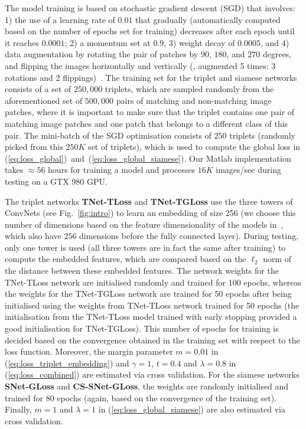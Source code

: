 \documentclass[10pt,twocolumn,letterpaper]{article}
\begin{document}
The model training is based on stochastic gradient descent (SGD) that involves: 1) the use of a learning rate of $0.01$ that gradually (automatically computed based on the number of epochs set for training) decreases after each epoch until it reaches $0.0001$; 2) a momentum set at $0.9$, 3) weight decay of $0.0005$, and 4) data augmentation by rotating the pair of patches by $90$, $180$, and $270$ degrees, and flipping the images horizontally and vertically (\ie, augmented 5 times: 3 rotations and 2 flippings)~\cite{ZagoruykoCVPR15}.
The training set for the triplet and siamese networks consists of a set of $250,000$ triplets, which are  sampled randomly from the aforementioned set of $500,000$ pairs of matching and non-matching image patches, where it is important to make sure that the triplet contains one pair of matching image patches and one patch that belongs to a different class of this pair.
The mini-batch of the SGD optimisation consists of $250$ triplets (randomly picked from this $250K$ set of triplets), which is used to compute the global loss in (\ref{eq:loss_global})~and~(\ref{eq:loss_global_siamese}).
Our Matlab implementation takes $\approx56$ hours for training a model and processes $16K$ images/sec during testing on a GTX 980 GPU.

The triplet networks {\bf TNet-TLoss} and {\bf TNet-TGLoss} use the three towers of ConvNets (see Fig.~\ref{fig:intro}) to learn an embedding of size 256 (we choose this number of dimensions based on the feature dimensionality of the models in~\cite{ZagoruykoCVPR15}, which also have $256$ dimensions before the fully connected layer).  During testing, only one tower is used (all three towers are in fact the same after training) to compute the embedded features, which are compared based on the $\ell_2$ norm of the distance between these embedded features.
The network weights for the {TNet-TLoss} network are initialised randomly and trained for 100 epochs, whereas the weights for the {TNet-TGLoss} network are trained for 50 epochs after being initialised using the weights from {TNet-TLoss} network trained for 50 epochs (the initialisation from the {TNet-TLoss} model trained with early stopping provided a good initialisation for {TNet-TGLoss}).
 This number of epochs for training is decided based on the convergence obtained in the training set with respect to the loss function.
Moreover, the margin parameter $m=0.01$ in (\ref{eq:loss_triplet_embedding}) and $\gamma=1$, $t=0.4$ and $\lambda=0.8$ in (\ref{eq:loss_combined}) are estimated via cross validation.
For the siamese networks {\bf SNet-GLoss} and {\bf CS-SNet-GLoss}, the weights are randomly initialised and trained for 80 epochs (again, based on the convergence of the training set).  Finally, $m=1$ and 
$\lambda=1$ in (\ref{eq:loss_global_siamese}) are also estimated via cross validation.
\end{document}
